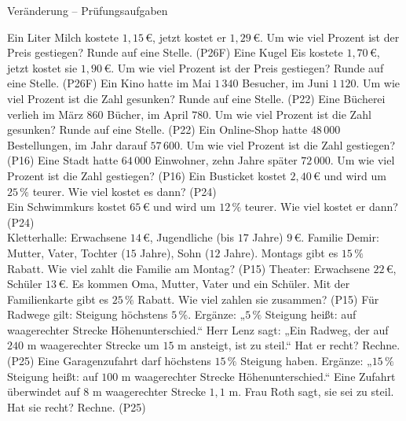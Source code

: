 \begin{aufgabe}{Veränderung – Prüfungsaufgaben}
\begin{teile}
\teil Ein Liter Milch kostete $1{,}15\,€$, jetzt kostet er $1{,}29\,€$. Um wie viel Prozent ist der Preis gestiegen? Runde auf eine Stelle. \hfill (P26F)
\teil Eine Kugel Eis kostete $1{,}70\,€$, jetzt kostet sie $1{,}90\,€$. Um wie viel Prozent ist der Preis gestiegen? Runde auf eine Stelle. \hfill (P26F)
\teil Ein Kino hatte im Mai $1\,340$ Besucher, im Juni $1\,120$. Um wie viel Prozent ist die Zahl gesunken? Runde auf eine Stelle. \hfill (P22)
\teil Eine Bücherei verlieh im März $860$ Bücher, im April $780$. Um wie viel Prozent ist die Zahl gesunken? Runde auf eine Stelle. \hfill (P22)
\teil Ein Online-Shop hatte $48\,000$ Bestellungen, im Jahr darauf $57\,600$. Um wie viel Prozent ist die Zahl gestiegen? \hfill (P16)
\teil Eine Stadt hatte $64\,000$ Einwohner, zehn Jahre später $72\,000$. Um wie viel Prozent ist die Zahl gestiegen? \hfill (P16)
\teil Ein Busticket kostet $2{,}40\,€$ und wird um $25\,\%$ teurer. Wie viel kostet es dann? \hfill (P24) \\ \leerfeld[€]
\teil Ein Schwimmkurs kostet $65\,€$ und wird um $12\,\%$ teurer. Wie viel kostet er dann? \hfill (P24) \\ \leerfeld[€]
\teil Kletterhalle: Erwachsene $14\,€$, Jugendliche (bis $17$ Jahre) $9\,€$. Familie Demir: Mutter, Vater, Tochter ($15$ Jahre), Sohn ($12$ Jahre). Montags gibt es $15\,\%$ Rabatt. Wie viel zahlt die Familie am Montag? \hfill (P15)
\teil Theater: Erwachsene $22\,€$, Schüler $13\,€$. Es kommen Oma, Mutter, Vater und ein Schüler. Mit der Familienkarte gibt es $25\,\%$ Rabatt. Wie viel zahlen sie zusammen? \hfill (P15)
\teil Für Radwege gilt: Steigung höchstens $5\,\%$. Ergänze: „$5\,\%$ Steigung heißt: auf \leerfeld[m] waagerechter Strecke \leerfeld[m] Höhenunterschied.“ Herr Lenz sagt: „Ein Radweg, der auf $240$ m waagerechter Strecke um $15$ m ansteigt, ist zu steil.“ Hat er recht? Rechne. \hfill (P25)
\teil Eine Garagenzufahrt darf höchstens $15\,\%$ Steigung haben. Ergänze: „$15\,\%$ Steigung heißt: auf $100$ m waagerechter Strecke \leerfeld[m] Höhenunterschied.“ Eine Zufahrt überwindet auf $8$ m waagerechter Strecke $1{,}1$ m. Frau Roth sagt, sie sei zu steil. Hat sie recht? Rechne. \hfill (P25)
\end{teile}
\end{aufgabe}

\medskip
{}
